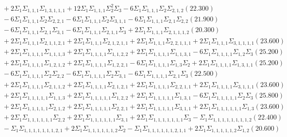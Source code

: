 \documentclass[12pt]{article}
\begin{document}
\begin{landscape}
\begin{align*}
		&\quad\quad +2\Sigma_{1}\Sigma_{1,1,1}\Sigma_{1,3,1,1,1}+12\Sigma_{1}\Sigma_{1,1,1}\Sigma_{2}^{2}\Sigma_{3}-6\Sigma_{1}\Sigma_{1,1,1}\Sigma_{2}\Sigma_{2,1,2}(22.300) \\ 
		&\quad\quad -6\Sigma_{1}\Sigma_{1,1,1}\Sigma_{2}\Sigma_{2,2,1}-6\Sigma_{1}\Sigma_{1,1,1}\Sigma_{2}\Sigma_{3,1,1}-6\Sigma_{1}\Sigma_{1,1,1}\Sigma_{2,1}\Sigma_{2,2}(21.900) \\ 
		&\quad\quad -6\Sigma_{1}\Sigma_{1,1,1}\Sigma_{2,1}\Sigma_{3,1}-6\Sigma_{1}\Sigma_{1,1,1}\Sigma_{2,1,1}\Sigma_{3}+2\Sigma_{1}\Sigma_{1,1,1}\Sigma_{2,1,1,1,2}(20.300) \\ 
		&\quad\quad +2\Sigma_{1}\Sigma_{1,1,1}\Sigma_{2,1,1,2,1}+2\Sigma_{1}\Sigma_{1,1,1}\Sigma_{2,1,2,1,1}+2\Sigma_{1}\Sigma_{1,1,1}\Sigma_{2,2,1,1,1}+2\Sigma_{1}\Sigma_{1,1,1}\Sigma_{3,1,1,1,1}(23.600) \\ 
		&\quad\quad +2\Sigma_{1}\Sigma_{1,1,1,1}\Sigma_{1,1,1,3}+2\Sigma_{1}\Sigma_{1,1,1,1}\Sigma_{1,1,2,2}+2\Sigma_{1}\Sigma_{1,1,1,1}\Sigma_{1,1,3,1}-6\Sigma_{1}\Sigma_{1,1,1,1}\Sigma_{1,2}\Sigma_{3}(25.200) \\ 
		&\quad\quad +2\Sigma_{1}\Sigma_{1,1,1,1}\Sigma_{1,2,1,2}+2\Sigma_{1}\Sigma_{1,1,1,1}\Sigma_{1,2,2,1}-6\Sigma_{1}\Sigma_{1,1,1,1}\Sigma_{1,3}\Sigma_{2}+2\Sigma_{1}\Sigma_{1,1,1,1}\Sigma_{1,3,1,1}(25.200) \\ 
		&\quad\quad -6\Sigma_{1}\Sigma_{1,1,1,1}\Sigma_{2}\Sigma_{2,2}-6\Sigma_{1}\Sigma_{1,1,1,1}\Sigma_{2}\Sigma_{3,1}-6\Sigma_{1}\Sigma_{1,1,1,1}\Sigma_{2,1}\Sigma_{3}(22.500) \\ 
		&\quad\quad +2\Sigma_{1}\Sigma_{1,1,1,1}\Sigma_{2,1,1,2}+2\Sigma_{1}\Sigma_{1,1,1,1}\Sigma_{2,1,2,1}+2\Sigma_{1}\Sigma_{1,1,1,1}\Sigma_{2,2,1,1}+2\Sigma_{1}\Sigma_{1,1,1,1}\Sigma_{3,1,1,1}(23.600) \\ 
		&\quad\quad +2\Sigma_{1}\Sigma_{1,1,1,1,1}\Sigma_{1,1,3}+2\Sigma_{1}\Sigma_{1,1,1,1,1}\Sigma_{1,2,2}+2\Sigma_{1}\Sigma_{1,1,1,1,1}\Sigma_{1,3,1}-6\Sigma_{1}\Sigma_{1,1,1,1,1}\Sigma_{2}\Sigma_{3}(25.800) \\ 
		&\quad\quad +2\Sigma_{1}\Sigma_{1,1,1,1,1}\Sigma_{2,1,2}+2\Sigma_{1}\Sigma_{1,1,1,1,1}\Sigma_{2,2,1}+2\Sigma_{1}\Sigma_{1,1,1,1,1}\Sigma_{3,1,1}+2\Sigma_{1}\Sigma_{1,1,1,1,1,1}\Sigma_{1,3}(23.600) \\ 
		&\quad\quad +2\Sigma_{1}\Sigma_{1,1,1,1,1,1}\Sigma_{2,2}+2\Sigma_{1}\Sigma_{1,1,1,1,1,1}\Sigma_{3,1}+2\Sigma_{1}\Sigma_{1,1,1,1,1,1,1}\Sigma_{3}-\Sigma_{1}\Sigma_{1,1,1,1,1,1,1,1,2}(22.400) \\ 
		&\quad\quad -\Sigma_{1}\Sigma_{1,1,1,1,1,1,1,2,1}+2\Sigma_{1}\Sigma_{1,1,1,1,1,1,2}\Sigma_{2}-\Sigma_{1}\Sigma_{1,1,1,1,1,1,2,1,1}+2\Sigma_{1}\Sigma_{1,1,1,1,1,2}\Sigma_{1,2}(20.600) \\ 

\end{align*}
\end{landscape}
\end{document}
